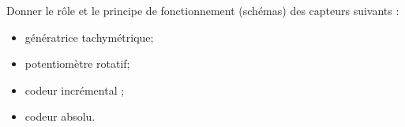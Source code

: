 Donner le rôle et le principe de fonctionnement (schémas) des capteurs suivants : 
\begin{itemize}
\item génératrice tachymétrique;
\item potentiomètre rotatif;
\item codeur incrémental ;
\item codeur absolu. 
\end{itemize}